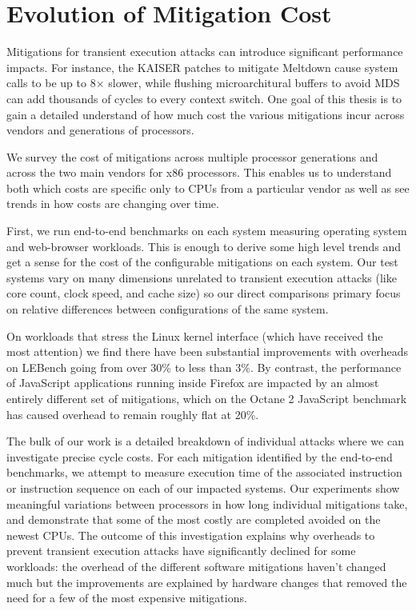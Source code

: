 \section{Evolution of Mitigation Cost}
Mitigations for transient execution attacks can introduce significant performance impacts.
For instance, the KAISER patches to mitigate Meltdown cause system calls to be up to 8$\times$ slower, while flushing microarchitural buffers to avoid MDS can add thousands of cycles to every context switch.
One goal of this thesis is to gain a detailed understand of how much cost the various mitigations incur across vendors and generations of processors.

We survey the cost of mitigations across multiple processor generations and across the two main vendors for x86 processors.
This enables us to understand both which costs are specific only to CPUs from a particular vendor as well as see trends in how costs are changing over time.


First, we run end-to-end benchmarks on each system measuring operating system and web-browser workloads.
This is enough to derive some high level trends and get a sense for the cost of the configurable mitigations on each system.
Our test systems vary on many dimensions unrelated to transient execution attacks (like core count, clock speed, and cache size) so our direct comparisons primary focus on relative differences between configurations of the same system.

On workloads that stress the Linux kernel interface (which have received the most attention) we find there have been substantial improvements with overheads on LEBench going from over 30\% to less than 3\%.
By contrast, the performance of JavaScript applications running inside Firefox are impacted by an almost entirely different set of mitigations, which on the Octane 2 JavaScript benchmark has caused overhead to remain roughly flat at 20\%. 


The bulk of our work is a detailed breakdown of individual attacks where we can investigate precise cycle costs.
For each mitigation identified by the end-to-end benchmarks, we attempt to measure execution time of the associated instruction or instruction sequence on each of our impacted systems.
Our experiments show meaningful variations between processors in how long individual mitigations take, and demonstrate that some of the most costly are completed avoided on the newest CPUs. 
The outcome of this investigation explains why overheads to prevent transient execution attacks have significantly declined for some workloads: the overhead of the different software mitigations haven't changed much but the improvements are explained by hardware changes that removed the need for a few of the most expensive mitigations.

